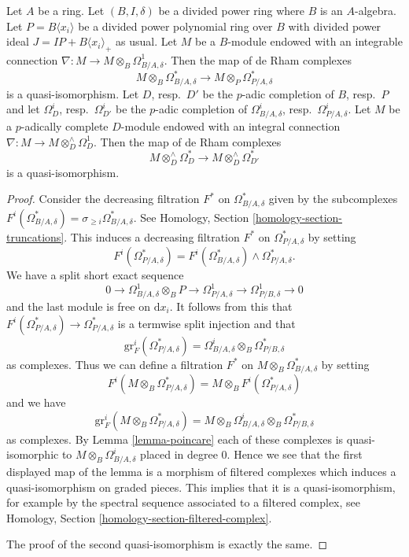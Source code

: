 \begin{lemma}
\label{lemma-relative-poincare}
Let $A$ be a ring. Let $(B, I, \delta)$ be a divided power ring
where $B$ is an $A$-algebra.
Let $P = B\langle x_i \rangle$ be a divided power polynomial
ring over $B$ with divided power ideal $J = IP + B\langle x_i \rangle_{+}$
as usual. Let $M$ be a $B$-module endowed with an integrable connection
$\nabla : M \to M \otimes_B \Omega^1_{B/A, \delta}$. Then the map of
de Rham complexes
$$
M \otimes_B \Omega^*_{B/A, \delta}
\longrightarrow
M \otimes_P \Omega^*_{P/A, \delta}
$$
is a quasi-isomorphism. Let $D$, resp.\ $D'$ be the $p$-adic completion of
$B$, resp.\ $P$ and let $\Omega^i_D$, resp.\ $\Omega^i_{D'}$ be the $p$-adic
completion of $\Omega^i_{B/A, \delta}$,
resp.\ $\Omega^i_{P/A, \delta}$. Let $M$ be a $p$-adically complete
$D$-module endowed with an integral connection
$\nabla : M \to M \otimes^\wedge_D \Omega^1_D$.
Then the map of de Rham complexes
$$
M \otimes^\wedge_D \Omega^*_D
\longrightarrow
M \otimes^\wedge_D \Omega^*_{D'}
$$
is a quasi-isomorphism.
\end{lemma}

\begin{proof}
Consider the decreasing filtration $F^*$ on $\Omega^*_{B/A, \delta}$
given by the subcomplexes
$F^i(\Omega^*_{B/A, \delta}) = \sigma_{\geq i}\Omega^*_{B/A, \delta}$.
See Homology, Section \ref{homology-section-truncations}.
This induces a decreasing filtration $F^*$ on $\Omega^*_{P/A, \delta}$
by setting
$$
F^i(\Omega^*_{P/A, \delta}) =
F^i(\Omega^*_{B/A, \delta}) \wedge \Omega^*_{P/A, \delta}.
$$
We have a split short exact sequence
$$
0 \to \Omega^1_{B/A, \delta} \otimes_B P \to
\Omega^1_{P/A, \delta} \to
\Omega^1_{P/B, \delta} \to 0
$$
and the last module is free on $\text{d}x_i$. It follows from this that
$F^i(\Omega^*_{P/A, \delta}) \to \Omega^*_{P/A, \delta}$ is a termwise
split injection and that
$$
\text{gr}^i_F(\Omega^*_{P/A, \delta}) =
\Omega^i_{B/A, \delta} \otimes_B \Omega^*_{P/B, \delta}
$$
as complexes. Thus we can define a filtration $F^*$ on
$M \otimes_B \Omega^*_{B/A, \delta}$ by setting
$$
F^i(M \otimes_B \Omega^*_{P/A, \delta}) =
M \otimes_B F^i(\Omega^*_{P/A, \delta})
$$
and we have
$$
\text{gr}^i_F(M \otimes_B \Omega^*_{P/A, \delta}) =
M \otimes_B \Omega^i_{B/A, \delta} \otimes_B \Omega^*_{P/B, \delta}
$$
as complexes.
By Lemma \ref{lemma-poincare} each of these complexes is
quasi-isomorphic to $M \otimes_B \Omega^i_{B/A, \delta}$ placed in degree $0$.
Hence we see that the first displayed map of the lemma is a morphism of
filtered complexes which induces a quasi-isomorphism on graded pieces. This
implies that it is a quasi-isomorphism, for example by the spectral sequence
associated to a filtered complex, see
Homology, Section \ref{homology-section-filtered-complex}.

\medskip\noindent
The proof of the second quasi-isomorphism is exactly the same.
\end{proof}



